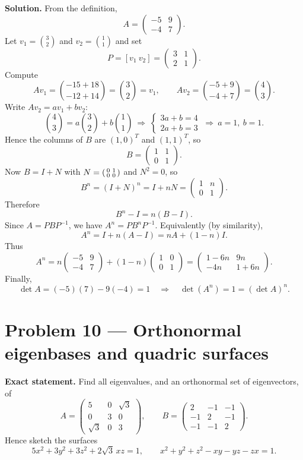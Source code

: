 \documentclass[12pt,a4paper]{article}
\theoremstyle{plain}
\theoremstyle{definition}      %
\begin{document}
\textbf{Solution.}
From the definition,
\[
A=\begin{pmatrix}-5&9\\-4&7\end{pmatrix}.
\]
Let $v_1=\binom{3}{2}$ and $v_2=\binom{1}{1}$ and set
\[
P=[v_1\ v_2]=\begin{pmatrix}3&1\\2&1\end{pmatrix}.
\]
Compute
\[
Av_1=\binom{-15+18}{-12+14}=\binom{3}{2}=v_1,
\qquad
Av_2=\binom{-5+9}{-4+7}=\binom{4}{3}.
\]
Write $Av_2=a v_1+b v_2$:
\[
\binom{4}{3}=a\binom{3}{2}+b\binom{1}{1}
\ \Longrightarrow\
\begin{cases}
	3a+b=4\\
	2a+b=3
\end{cases}
\ \Longrightarrow\ a=1,\ b=1.
\]
Hence the columns of $B$ are $(1,0)^T$ and $(1,1)^T$, so
\[
\boxed{
	B=\begin{pmatrix}1&1\\0&1\end{pmatrix}.}
\]
Now $B=I+N$ with $N=\begin{psmallmatrix}0&1\\0&0\end{psmallmatrix}$ and $N^2=0$, so
\[
B^n=(I+N)^n=I+nN=\begin{pmatrix}1&n\\0&1\end{pmatrix}.
\]
Therefore
\[
\boxed{B^n-I=n(B-I).}
\]
Since $A=PBP^{-1}$, we have $A^n=PB^nP^{-1}$. Equivalently (by similarity),
\[
A^n=I+n(A-I)=nA+(1-n)I.
\]
Thus
\[
\boxed{
	A^n
	=
	n\begin{pmatrix}-5&9\\-4&7\end{pmatrix}+(1-n)\begin{pmatrix}1&0\\0&1\end{pmatrix}
	=
	\begin{pmatrix}
		1-6n & 9n\\
		-4n & 1+6n
	\end{pmatrix}.}
\]
Finally,
\[
\det A = (-5)(7)-9(-4)=1
\quad\Rightarrow\quad
\det(A^n)=1=(\det A)^n.
\]

\section*{Problem 10 — Orthonormal eigenbases and quadric surfaces}

\textbf{Exact statement.}
Find all eigenvalues, and an orthonormal set of eigenvectors, of
\[
A=\begin{pmatrix}5&0&\sqrt3\\[2pt]0&3&0\\[2pt]\sqrt3&0&3\end{pmatrix},
\qquad
B=\begin{pmatrix}2&-1&-1\\[2pt]-1&2&-1\\[2pt]-1&-1&2\end{pmatrix}.
\]
Hence sketch the surfaces
\[
5x^2+3y^2+3z^2+2\sqrt3\,xz=1,
\qquad
x^2+y^2+z^2-xy-yz-zx=1.
\]
\end{document}
